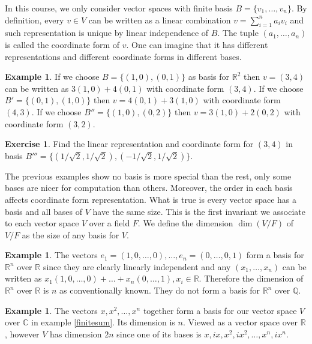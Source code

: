 \documentclass[12pt]{amsart}
\theoremstyle{definition}
\newtheorem{example}[theorem]{Example}
\newtheorem{exercise}[theorem]{Exercise}
\begin{document}
In this course, we only consider vector spaces with finite basis $B = \{v_1, \dots , v_n\}$. By definition, every $v \in V$ can be written as a linear combination $v = \sum\limits_{i = 1}^n a_i v_i$ and such representation is unique by linear independence of $B$. The tuple $(a_1, \dots , a_n)$ is called the coordinate form of $v$. One can imagine that it has different representations and different coordinate forms in different bases.

\begin{example}\label{changeofbasis1} If we choose $B = \{(1,0),(0,1)\}$ as basis for $\mathbb{R}^2$ then $v = (3,4)$ can be written as $3(1,0) + 4(0,1)$ with coordinate form $(3,4)$. If we choose $B' = \{(0,1),(1,0)\}$ then $v = 4(0,1) + 3(1,0)$ with coordinate form $(4,3)$. If we choose $B'' = \{(1,0), (0,2)\}$ then $v = 3(1,0) + 2(0,2)$ with coordinate form $(3,2)$.
\end{example}

\begin{exercise}\label{changeofbasis2} Find the linear representation and coordinate form for $(3,4)$ in basis $B''' = \{(1/ \sqrt{2}, 1/ \sqrt{2}), (-1/ \sqrt{2}, 1/ \sqrt{2})\}$.
\end{exercise}

The previous examples show no basis is more special than the rest, only some bases are nicer for computation than others. Moreover, the order in each basis affects coordinate form representation. What is true is every vector space has a basis and all bases of $V$ have the same size. This is the first invariant we associate to each vector space $V$ over a field $F$.
\dfn We define the dimension $\dim(V/F)$ of $V/F$ as the size of any basis for $V$.

\begin{example} The vectors $e_1 = (1,0, \dots, 0), \dots , e_n = (0, \dots, 0, 1)$ form a basis for $\mathbb{R}^n$ over $\mathbb{R}$ since they are clearly linearly independent and any $(x_1, \dots , x_n)$ can be written as $x_1(1,0, \dots , 0) + \ldots + x_n(0, \dots , 1), x_i \in \mathbb{R}$. Therefore the dimension of $\mathbb{R}^n$ over $\mathbb{R}$ is $n$ as conventionally known. They do not form a basis for $\mathbb{R}^n$ over $\mathbb{Q}$.
\end{example}

\begin{example} The vectors $x, x^2, \dots , x^n$ together form a basis for our vector space $V$ over $\mathbb{C}$ in example \ref{finitesum}. Its dimension is $n$. Viewed as a vector space over $\mathbb{R}$, however $V$ has dimension $2n$ since one of its bases is $x, ix, x^2, ix^2, \dots , x^n, ix^n$.
\end{example}
\end{document}
